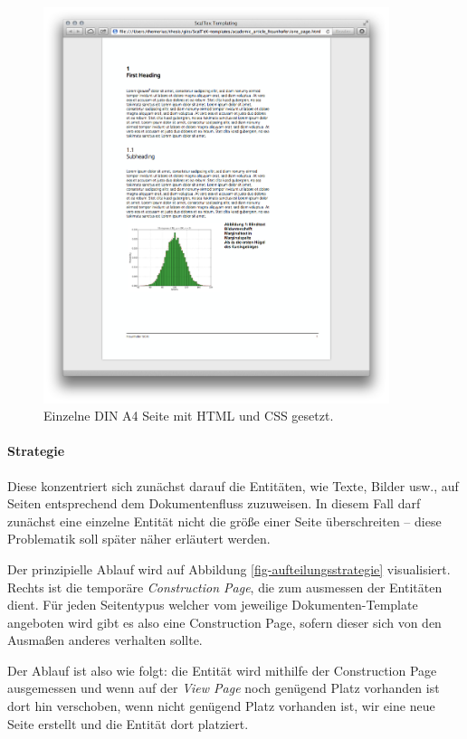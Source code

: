 \newpage
\begin{figure}[h!]
  \centering
    \includegraphics[width=0.9\textwidth]{figures/one_page.png}
  \caption{Einzelne DIN A4 Seite mit HTML und CSS gesetzt.}\label{fig-one_page}
\end{figure}
\newpage

\paragraph{Strategie}
Diese konzentriert sich zunächst darauf die Entitäten, wie Texte, Bilder usw.,
auf Seiten entsprechend dem Dokumentenfluss zuzuweisen.
In diesem Fall darf zunächst eine
einzelne Entität nicht die größe einer Seite überschreiten -- diese
Problematik soll später näher erläutert werden.

Der prinzipielle Ablauf wird auf Abbildung \ref{fig-aufteilungsstrategie}
visualisiert. Rechts ist die temporäre \emph{Construction Page}, die zum
ausmessen der Entitäten dient. Für jeden Seitentypus welcher vom jeweilige
Dokumenten-Template angeboten wird gibt es also eine Construction Page, sofern
dieser sich von den Ausmaßen anderes verhalten sollte.

Der Ablauf ist also wie folgt: die Entität wird mithilfe der Construction
Page ausgemessen und wenn auf der \emph{View Page} noch genügend Platz
vorhanden ist dort hin verschoben, wenn nicht genügend Platz vorhanden ist,
wir eine neue Seite erstellt und die Entität dort platziert.

